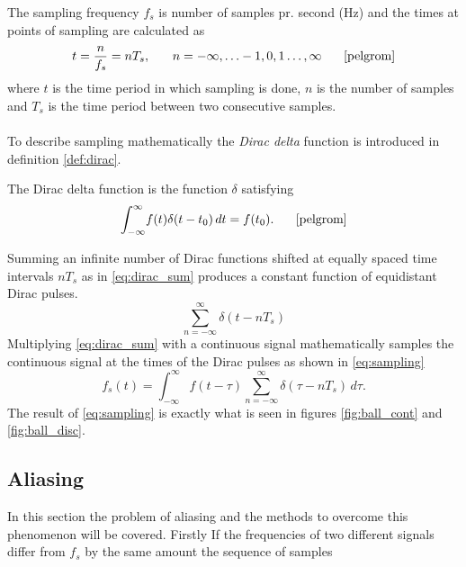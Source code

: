 \noindent The sampling frequency $f_s$ is number of samples pr. second (Hz) and the times at points of sampling are calculated as
\begin{equation}\label{eq:sample_freq}
t=\frac{n}{f_s}=nT_s, \phantom{mm} n=-\infty,\hdots-1,0,1\hdots,\infty \phantom{mm}\text{\cite{pelgrom}}
\end{equation}
where $t$ is the time period in which sampling is done, $n$ is the number of samples and $T_s$ is the time period between two consecutive samples.\\\\
To describe sampling mathematically the \textit{Dirac delta} function is introduced in definition \ref{def:dirac}.
\begin{definition}\label{def:dirac}
The Dirac delta function is the function $\delta$ satisfying
\begin{equation}
\int_{-\infty}^{\infty} \! f(t)\delta(t-t_0) \, dt=f(t_0).\phantom{mm}\text{\cite{pelgrom}}
\end{equation}
\end{definition}
Summing an infinite number of Dirac functions shifted at equally spaced time intervals $nT_s$ as in \eqref{eq:dirac_sum} produces a constant function of equidistant Dirac pulses.
\begin{equation}\label{eq:dirac_sum}
\sum_{n=-\infty}^{\infty}\delta(t-nT_s)
\end{equation}
Multiplying \eqref{eq:dirac_sum} with a continuous signal mathematically samples the continuous signal at the times of the Dirac pulses as shown in \eqref{eq:sampling}
\begin{equation}\label{eq:sampling}
f_s(t)=\int_{-\infty}^{\infty} \! f(t-\tau)\sum_{n=-\infty}^{\infty}\delta(\tau - nT_s) \, d\tau.
\end{equation}
The result of \eqref{eq:sampling} is exactly what is seen in figures \ref{fig:ball_cont} and \ref{fig:ball_disc}.
\subsection{Aliasing}\label{sec:aliasing}
In this section the problem of aliasing and the methods to overcome this phenomenon will be covered. Firstly 
If the frequencies of two different signals differ from $f_s$ by the same amount the sequence of samples 





